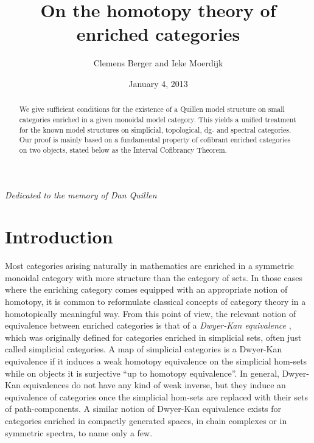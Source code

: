 \documentclass[10pt]{amsart}
\theoremstyle{plain}
\theoremstyle{remark}
\begin{document}
\title{On the homotopy theory of enriched categories}

\author{Clemens Berger and Ieke Moerdijk}

\date{January 4, 2013}


\begin{abstract}We give sufficient conditions for the existence of a Quillen model structure on small categories enriched in a given monoidal model category. This yields a unified treatment for the known model structures on simplicial, topological, dg- and spectral categories. Our proof is mainly based on a fundamental property of cofibrant enriched categories on two objects, stated below as the Interval Cofibrancy Theorem.\end{abstract}

\maketitle

\begin{flushright}\emph{Dedicated to the memory of Dan Quillen}\end{flushright}

\section*{Introduction}

Most categories arising naturally in mathematics are enriched in a symmetric monoidal category with more structure than the category of sets. In those cases where the enriching category comes equipped with an appropriate notion of homotopy, it is common to reformulate classical concepts of category theory in a homotopically meaningful way. From this point of view, the relevant notion of equivalence between enriched categories is that of a \emph{Dwyer-Kan equivalence} \cite{DK}, which was originally defined for categories enriched in simplicial sets, often just called simplicial categories. A map of simplicial categories is a Dwyer-Kan equivalence if it induces a weak homotopy equivalence on the simplicial hom-sets while on objects it is surjective ``up to homotopy equivalence''. In general, Dwyer-Kan equivalences do not have any kind of weak inverse, but they induce an equivalence of categories once the simplicial hom-sets are replaced with their sets of path-components. A similar notion of Dwyer-Kan equivalence exists for categories enriched in compactly generated spaces, in chain complexes or in symmetric spectra, to name only a few.
\end{document}
